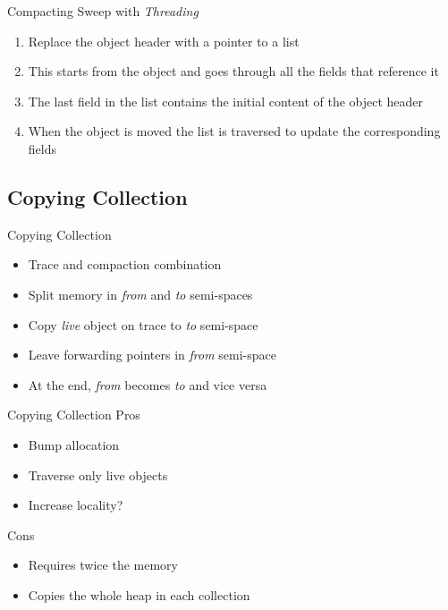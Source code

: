 \documentclass[
14pt,
aspectratio=169,
usenames,
dvipsnames,
x11names]{beamer}
\newcommand{\tik}[0]{{\color{YellowGreen}\Checkmark}} %
\newcommand{\ex}[0]{{\color{BrickRed}\XSolidBrush}}  %
\begin{document}
\begin{frame}{Compacting Sweep with \textit{Threading}}
  \begin{enumerate}  \setlength{\itemsep}{\fill}
  \item Replace the object header with a pointer to a list
  \item This starts from the object and goes through all the fields that reference it
  \item The last field in the list contains the initial content of the object header
  \item When the object is moved the list is traversed to update the corresponding fields
  \end{enumerate}
\end{frame}

\subsection{Copying Collection}

\begin{frame}{Copying Collection}
  \begin{itemize}  \setlength{\itemsep}{\fill}
  \item \alert{Trace and compaction} combination
  \item \alert{Split memory} in \textit{from} and \textit{to} semi-spaces
  \item \alert{Copy} \textit{live} object on trace to \textit{to} semi-space
  \item \alert{Leave} forwarding pointers in \textit{from} semi-space
  \item At the end, \textit{from} becomes \textit{to} and vice versa
  \end{itemize}
\end{frame}

\begin{frame}{Copying Collection}
  Pros \tik
  \begin{itemize}  \setlength{\itemsep}{\fill}
  \item \alert{Bump} allocation
  \item Traverse \alert{only live} objects
  \item \alert{Increase locality?}
  \end{itemize}

  \pause

  Cons \ex
  \begin{itemize}  \setlength{\itemsep}{\fill}
  \item Requires \alert{twice the memory}
  \item \alert{Copies the whole heap} in each collection
  \end{itemize}
\end{frame}
\end{document}
